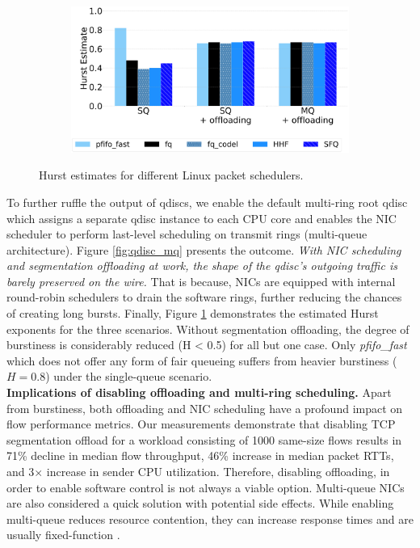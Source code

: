 \begin{figure}[t]
\centering
\begin{subfigure}[t]{0.75\linewidth}
    \centering
    	\includegraphics[width=1\linewidth]{figs/nic_hurst_bar.pdf}
\end{subfigure}
\vspace{-2mm}
\caption{\small{Hurst estimates for different Linux packet schedulers.}}
	\label{fig:nic_hurst_bar}
\vspace{-2mm}
\end{figure}

To further ruffle the output of qdiscs, we enable the default multi-ring root qdisc which assigns a separate qdisc instance to each CPU core and enables the NIC scheduler to perform last-level scheduling on transmit rings (multi-queue architecture). Figure \ref{fig:qdisc_mq} presents the outcome. \textit{With NIC scheduling and segmentation offloading at work, the shape of the qdisc's outgoing traffic is barely preserved on the wire.} That is because, NICs are equipped with internal round-robin schedulers to drain the software rings, further reducing the chances of creating long bursts. Finally, Figure \ref{fig:nic_hurst_bar} demonstrates the estimated Hurst exponents for the three scenarios. Without segmentation offloading, the degree of burstiness is considerably reduced (H < 0.5) for all but one case. Only \textit{pfifo\_fast} which does not offer any form of fair queueing suffers from heavier burstiness ($H=0.8$) under the single-queue scenario.
\\
\textbf{Implications of disabling offloading and multi-ring scheduling.}
Apart from burstiness, both offloading and NIC scheduling have a profound impact on flow performance metrics. Our measurements demonstrate that disabling TCP segmentation offload for a workload consisting of 1000 same-size flows results in 71\% decline in median flow throughput, 46\% increase in median packet RTTs, and 3$\times$ increase in sender CPU utilization. Therefore, disabling offloading, in order to enable software control is not always a viable option. 
Multi-queue NICs are also considered a quick solution with potential side effects. While enabling multi-queue reduces resource contention, they can increase response times and are usually fixed-function \cite{titan}.

